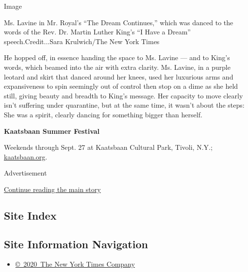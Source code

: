 Image

Ms. Lavine in Mr. Royal's ``The Dream Continues,'' which was danced to
the words of the Rev. Dr. Martin Luther King's ``I Have a Dream''
speech.Credit...Sara Krulwich/The New York Times

He hopped off, in essence handing the space to Ms. Lavine --- and to
King's words, which beamed into the air with extra clarity. Ms. Lavine,
in a purple leotard and skirt that danced around her knees, used her
luxurious arms and expansiveness to spin seemingly out of control then
stop on a dime as she held still, giving beauty and breadth to King's
message. Her capacity to move clearly isn't suffering under quarantine,
but at the same time, it wasn't about the steps: She was a spirit,
clearly dancing for something bigger than herself.

\textbf{Kaatsbaan Summer Festival}

Weekends through Sept. 27 at Kaatsbaan Cultural Park, Tivoli, N.Y.;
\href{https://kaatsbaan.org/spring-summer-events}{kaatsbaan.org}.

Advertisement

\protect\hyperlink{after-bottom}{Continue reading the main story}

\hypertarget{site-index}{%
\subsection{Site Index}\label{site-index}}

\hypertarget{site-information-navigation}{%
\subsection{Site Information
Navigation}\label{site-information-navigation}}

\begin{itemize}
\tightlist
\item
  \href{https://help.nytimes3xbfgragh.onion/hc/en-us/articles/115014792127-Copyright-notice}{©~2020~The
  New York Times Company}
\end{itemize}

